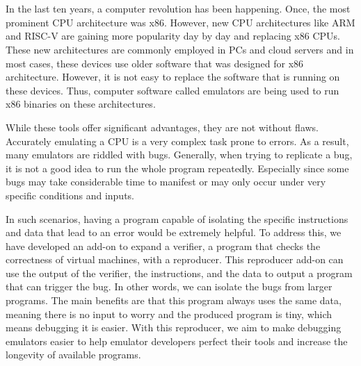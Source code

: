 \chapter{\abstractname}



In the last ten years, a computer revolution has been happening.
Once, the most prominent CPU architecture was x86.
However, new CPU architectures like ARM and RISC-V are gaining more popularity day by day and replacing x86 CPUs.
These new architectures are commonly employed in PCs and cloud servers and in most cases, these devices use older software that was designed for x86 architecture.
However, it is not easy to replace the software that is running on these devices.
Thus, computer software called emulators are being used to run x86 binaries on these architectures.

While these tools offer significant advantages, they are not without flaws.
Accurately emulating a CPU  is a very complex task prone to errors.
As a result, many emulators are riddled with bugs.
Generally, when trying to replicate a bug, it is not a good idea to run the whole program repeatedly.
Especially since some bugs may take considerable time to manifest or may only occur under very specific conditions and inputs.

In such scenarios, having a program capable of isolating the specific instructions and data that lead to an error would be extremely helpful.
To address this, we have developed an add-on to expand a verifier, a program that checks the correctness of virtual machines, with a reproducer.
This reproducer add-on can use the output of the verifier, the instructions, and the data to output a program that can trigger the bug.
In other words, we can isolate the bugs from larger programs.
The main benefits are that this program always uses the same data, meaning there is no input to worry and the produced program is tiny, which means debugging it is easier.
With this reproducer, we aim to make debugging emulators easier to help emulator developers perfect their tools and increase the longevity of available programs.